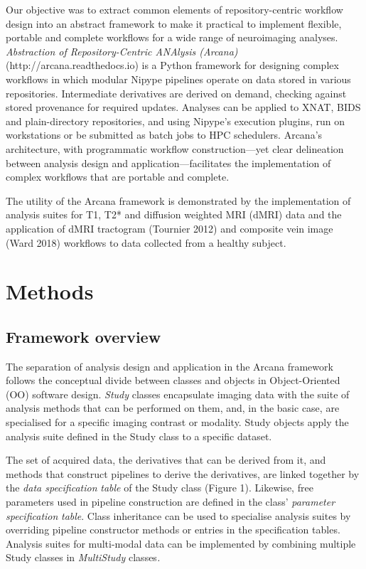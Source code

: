 Our objective was to extract common elements of repository-centric
workflow design into an abstract framework to make it practical to
implement flexible, portable and complete workflows for a wide range of
neuroimaging analyses. \emph{Abstraction of Repository-Centric ANAlysis
(Arcana)} (http://arcana.readthedocs.io) is a Python framework for
designing complex workflows in which modular Nipype pipelines operate on
data stored in various repositories. Intermediate derivatives are
derived on demand, checking against stored provenance for required
updates. Analyses can be applied to XNAT, BIDS and plain-directory
repositories, and using Nipype's execution plugins, run on workstations
or be submitted as batch jobs to HPC schedulers. Arcana's architecture,
with programmatic workflow construction---yet clear delineation between
analysis design and application---facilitates the implementation of
complex workflows that are portable and complete.

The utility of the Arcana framework is demonstrated by the
implementation of analysis suites for T1, T2* and diffusion weighted MRI
(dMRI) data and the application of dMRI tractogram (Tournier 2012) and
composite vein image (Ward 2018) workflows to data collected from a
healthy subject.

\section{Methods}
\label{methods}

\subsection{Framework overview}
\label{framework-overview}

The separation of analysis design and application in the Arcana
framework follows the conceptual divide between classes and objects in
Object-Oriented (OO) software design. \emph{Study} classes encapsulate
imaging data with the suite of analysis methods that can be performed on
them, and, in the basic case, are specialised for a specific imaging
contrast or modality. Study objects apply the analysis suite defined in
the Study class to a specific dataset.

The set of acquired data, the derivatives that can be derived from it,
and methods that construct pipelines to derive the derivatives, are
linked together by the \emph{data specification} \emph{table} of the
Study class (Figure 1). Likewise, free parameters used in pipeline
construction are defined in the class' \emph{parameter specification}
\emph{table}. Class inheritance can be used to specialise analysis
suites by overriding pipeline constructor methods or entries in the
specification tables. Analysis suites for multi-modal data can be
implemented by combining multiple Study classes in \emph{MultiStudy}
classes\emph{.}

